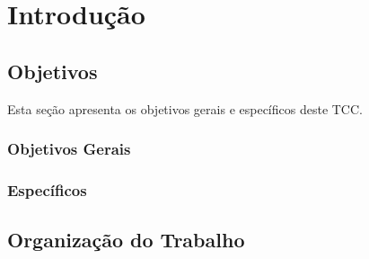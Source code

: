\chapter{Introdução}



\section{Objetivos}

Esta seção apresenta os objetivos gerais e específicos deste TCC.

\subsection{Objetivos Gerais}


\subsection{Específicos}



\section{Organização do Trabalho}
